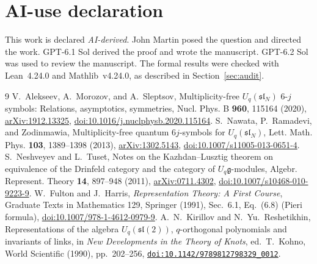 \documentclass[10pt,a4paper]{article}
\newenvironment{revision}{\begingroup}{\endgroup}
\begin{document}
\begin{revision}
\section*{AI-use declaration}
This work is declared \emph{AI-derived}. John Martin posed the question
and directed the work. GPT-6.1 Sol derived the proof and wrote the
manuscript. GPT-6.2 Sol was used to review the
manuscript. The formal results were checked with Lean~4.24.0 and
Mathlib~v4.24.0, as described in Section~\ref{sec:audit}.
\end{revision}

\begin{thebibliography}{9}
 V.~Alekseev, A.~Morozov, and A.~Sleptsov,
Multiplicity-free $U_q(\mathfrak{sl}_N)$ $6$-$j$ symbols: Relations,
asymptotics, symmetries, Nucl. Phys. B \textbf{960}, 115164 (2020),
\href{https://arxiv.org/abs/1912.13325}{arXiv:1912.13325},
\href{https://doi.org/10.1016/j.nuclphysb.2020.115164}{doi:10.1016/j.nuclphysb.2020.115164}.
 S.~Nawata, P.~Ramadevi, and Zodinmawia,
Multiplicity-free quantum $6j$-symbols for $U_q(\mathfrak{sl}_N)$,
Lett. Math. Phys. \textbf{103}, 1389--1398 (2013),
\href{https://arxiv.org/abs/1302.5143}{arXiv:1302.5143},
\href{https://doi.org/10.1007/s11005-013-0651-4}{doi:10.1007/s11005-013-0651-4}.
 S.~Neshveyev and L.~Tuset,
Notes on the Kazhdan--Lusztig theorem on equivalence of the Drinfeld
category and the category of $U_q\mathfrak g$-modules,
Algebr. Represent. Theory \textbf{14}, 897--948 (2011),
\href{https://arxiv.org/abs/0711.4302}{arXiv:0711.4302},
\href{https://doi.org/10.1007/s10468-010-9223-9}{doi:10.1007/s10468-010-9223-9}.
 W.~Fulton and J.~Harris, \emph{Representation Theory:
A First Course}, Graduate Texts in Mathematics 129, Springer (1991),
Sec.~6.1, Eq.~(6.8) (Pieri formula),
\href{https://doi.org/10.1007/978-1-4612-0979-9}{doi:10.1007/978-1-4612-0979-9}.
 A.~N.~Kirillov and N.~Yu.~Reshetikhin,
Representations of the algebra $U_q(\mathfrak{sl}(2))$, $q$-orthogonal
polynomials and invariants of links, in \emph{New Developments in the
Theory of Knots}, ed.~T.~Kohno, World Scientific (1990), pp.~202--256,
\href{https://doi.org/10.1142/9789812798329_0012}{\nolinkurl{doi:10.1142/9789812798329_0012}}.
\end{thebibliography}
\end{document}
